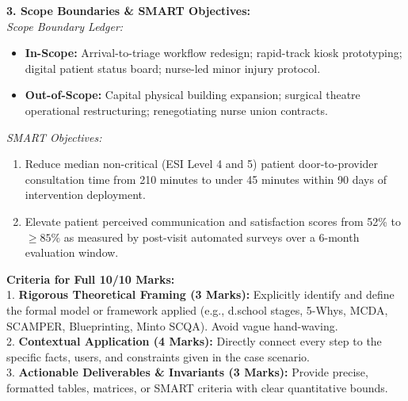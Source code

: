 \begin{solbox}
\textbf{3. Scope Boundaries \& SMART Objectives:}\\
\textit{Scope Boundary Ledger:}
\begin{itemize}
    \item \textbf{In-Scope:} Arrival-to-triage workflow redesign; rapid-track kiosk prototyping; digital patient status board; nurse-led minor injury protocol.
    \item \textbf{Out-of-Scope:} Capital physical building expansion; surgical theatre operational restructuring; renegotiating nurse union contracts.
\end{itemize}

\textit{SMART Objectives:}
\begin{enumerate}[label=Objective \arabic*:]
    \item Reduce median non-critical (ESI Level 4 and 5) patient door-to-provider consultation time from 210 minutes to under 45 minutes within 90 days of intervention deployment.
    \item Elevate patient perceived communication and satisfaction scores from 52\% to $\ge 85\%$ as measured by post-visit automated surveys over a 6-month evaluation window.
\end{enumerate}
\end{solbox}

\begin{examinertip}
\textbf{Criteria for Full 10/10 Marks:}\\
1. \textbf{Rigorous Theoretical Framing (3 Marks):} Explicitly identify and define the formal model or framework applied (e.g., d.school stages, 5-Whys, MCDA, SCAMPER, Blueprinting, Minto SCQA). Avoid vague hand-waving.\\
2. \textbf{Contextual Application (4 Marks):} Directly connect every step to the specific facts, users, and constraints given in the case scenario.\\
3. \textbf{Actionable Deliverables \& Invariants (3 Marks):} Provide precise, formatted tables, matrices, or SMART criteria with clear quantitative bounds.
\end{examinertip}
